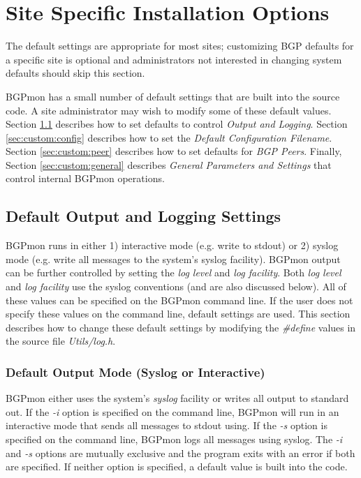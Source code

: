 \section{Site Specific Installation Options}
\label{sec:custom}

The default settings are appropriate for most sites;  customizing BGP defaults for a specific site is optional and administrators not interested in changing system defaults should skip this section.  

BGPmon has a small number of default settings that are built into the source code.  A site administrator may wish to modify some of these default values.    Section \ref{sec:custom:log} describes how to set defaults to control \emph{Output and Logging}.   Section \ref{sec:custom:config} describes how to set the \emph{Default Configuration Filename}.  Section \ref{sec:custom:peer} describes how to set defaults for \emph{BGP Peers}.    Finally, Section \ref{sec:custom:general} describes \emph{General Parameters and Settings} that control internal BGPmon operations.

\subsection{Default Output and Logging Settings}
\label{sec:custom:log}

BGPmon runs in either 1) interactive mode (e.g. write to stdout) or 2) syslog mode (e.g. write all messages to the system's syslog facility).    BGPmon output can be further controlled by setting the \emph{log level} and \emph{log facility}.    Both \emph{log level} and \emph{log facility} use the syslog conventions (and are also discussed below).    All of these values can be specified on the BGPmon command line. If the user does not specify these values on the command line, default settings are used.    This section describes how to change these default settings by modifying the \emph{\#define} values in the source file \emph{Utils/log.h}.

\subsubsection{Default Output Mode (Syslog or Interactive)}

BGPmon either uses the system's \emph{syslog} facility or writes all output to standard out.  If the \emph{-i} option is specified on the command line, BGPmon will run in an interactive mode that sends all messages to stdout using.    If the \emph{-s} option is specified on the command line, BGPmon logs all messages using syslog.    The \emph{-i} and \emph{-s} options are mutually exclusive and the program exits with an error if both are specified.    If neither option is specified,  a default value is built into the code.   

